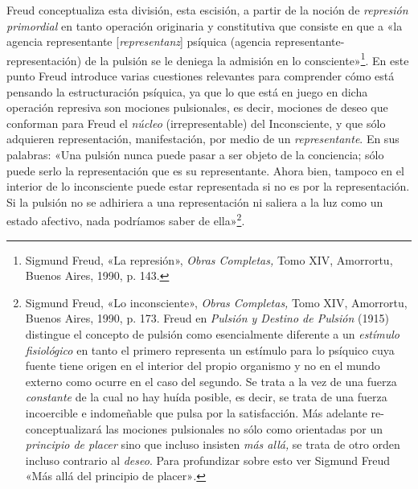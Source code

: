 Freud conceptualiza esta división, esta escisión, a partir de la noción de \emph{represión primordial} en tanto operación originaria y constitutiva que consiste en que a «la agencia representante {[}\emph{representanz}{]} psíquica (agencia representante-representación) de la pulsión se le deniega la admisión en lo consciente»\footnote{Sigmund Freud, «La represión», \emph{Obras Completas,} Tomo XIV, Amorrortu, Buenos Aires, 1990, p. 143.}. En este punto Freud introduce varias cuestiones relevantes para comprender cómo está pensando la estructuración psíquica, ya que lo que está en juego en dicha operación represiva son mociones pulsionales, es decir, mociones de deseo que conforman para Freud el \emph{núcleo} (irrepresentable) del Inconsciente, y que sólo adquieren representación, manifestación, por medio de un \emph{representante}. En sus palabras: «Una pulsión nunca puede pasar a ser objeto de la conciencia; sólo puede serlo la representación que es su representante. Ahora bien, tampoco en el interior de lo inconsciente puede estar representada si no es por la representación. Si la pulsión no se adhiriera a una representación ni saliera a la luz como un estado afectivo, nada podríamos saber de ella»\footnote{Sigmund Freud, «Lo inconsciente», \emph{Obras Completas,} Tomo XIV, Amorrortu, Buenos Aires, 1990, p. 173. Freud en \emph{Pulsión y Destino de Pulsión} (1915) distingue el concepto de pulsión como esencialmente diferente a un \emph{estímulo fisiológico} en tanto el primero representa un estímulo para lo psíquico cuya fuente tiene origen en el interior del propio organismo y no en el mundo externo como ocurre en el caso del segundo. Se trata a la vez de una fuerza \emph{constante} de la cual no hay huída posible, es decir, se trata de una fuerza incoercible e indomeñable que pulsa por la satisfacción. Más adelante re-conceptualizará las mociones pulsionales no sólo como orientadas por un \emph{principio de placer} sino que incluso insisten \emph{más allá,} se trata de otro orden incluso contrario al \emph{deseo}. Para profundizar sobre esto ver Sigmund Freud «Más allá del principio de placer»\emph{.}}.


